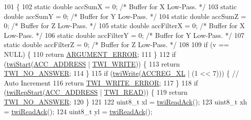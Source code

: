 \begin{DoxyCode}
101                            \{
102     \textcolor{keyword}{static} \textcolor{keywordtype}{double} accSumX = 0; \textcolor{comment}{/* Buffer for X Low-Pass. */}
103     \textcolor{keyword}{static} \textcolor{keywordtype}{double} accSumY = 0; \textcolor{comment}{/* Buffer for Y Low-Pass. */}
104     \textcolor{keyword}{static} \textcolor{keywordtype}{double} accSumZ = 0; \textcolor{comment}{/* Buffer for Z Low-Pass. */}
105     \textcolor{keyword}{static} \textcolor{keywordtype}{double} accFilterX = 0; \textcolor{comment}{/* Buffer for X Low-Pass. */}
106     \textcolor{keyword}{static} \textcolor{keywordtype}{double} accFilterY = 0; \textcolor{comment}{/* Buffer for Y Low-Pass. */}
107     \textcolor{keyword}{static} \textcolor{keywordtype}{double} accFilterZ = 0; \textcolor{comment}{/* Buffer for Z Low-Pass. */}
108 
109     \textcolor{keywordflow}{if} (v == NULL) \{
110         \textcolor{keywordflow}{return} \hyperlink{group__error_gga2c3e4bb40f36b262a5214e2da2bca9c5a49ccf277a69dd938c591928aa27c66cc}{ARGUMENT\_ERROR};
111     \}
112     \textcolor{keywordflow}{if} (\hyperlink{group__twi_ga4f86edc73f37ce976ea2225519ab31cd}{twiStart}(\hyperlink{group__acc_ga27341a8e1cb1a6ace5a5cf3caea1c99f}{ACC\_ADDRESS} | \hyperlink{group__twi_ga3b68e8e777b71520f9dbfac733774d5f}{TWI\_WRITE})) \{
113         \textcolor{keywordflow}{return} \hyperlink{group__error_gga2c3e4bb40f36b262a5214e2da2bca9c5a04d5943ba652af2205c88b247e0c659c}{TWI\_NO\_ANSWER};
114     \}
115     \textcolor{keywordflow}{if} (\hyperlink{group__twi_gaf42e50aaf4a9794d3a2c000e7b407887}{twiWrite}(\hyperlink{group__acc_ga9d03f89f2f3ef006967f84157a21075b}{ACCREG\_XL} | (1 << 7))) \{ \textcolor{comment}{// Auto Increment}
116         \textcolor{keywordflow}{return} \hyperlink{group__error_gga2c3e4bb40f36b262a5214e2da2bca9c5ac0e3b3463dcaf220e54794b4711708c9}{TWI\_WRITE\_ERROR};
117     \}
118     \textcolor{keywordflow}{if} (\hyperlink{group__twi_ga996e3cbbbb7239e2278bd286e61f0791}{twiRepStart}(\hyperlink{group__acc_ga27341a8e1cb1a6ace5a5cf3caea1c99f}{ACC\_ADDRESS} | \hyperlink{group__twi_gaaf9a8abccd811954f9cc316f2b2f87b3}{TWI\_READ})) \{
119         \textcolor{keywordflow}{return} \hyperlink{group__error_gga2c3e4bb40f36b262a5214e2da2bca9c5a04d5943ba652af2205c88b247e0c659c}{TWI\_NO\_ANSWER};
120     \}
121 
122     uint8\_t xl = \hyperlink{group__twi_ga0ab816bd0abcc24d6817f8395de7eafd}{twiReadAck}();
123     uint8\_t xh = \hyperlink{group__twi_ga0ab816bd0abcc24d6817f8395de7eafd}{twiReadAck}();
124     uint8\_t yl = \hyperlink{group__twi_ga0ab816bd0abcc24d6817f8395de7eafd}{twiReadAck}();

\end{DoxyCode}
